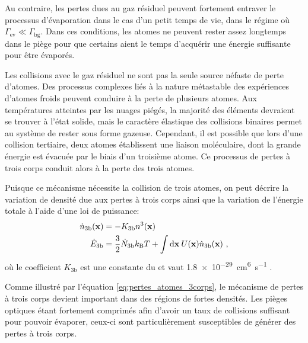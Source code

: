 Au contraire, les pertes dues au gaz résiduel peuvent fortement entraver le processus d'évaporation dans le cas d'un petit temps de vie, dans le régime où $\Gamma_{\mathrm{ev}} \ll \Gamma_{\mathrm{bg}}$. Dans ces conditions, les atomes ne peuvent rester assez longtemps dans le piège pour que certains aient le temps d'acquérir une énergie suffisante pour être évaporés.



Les collisions avec le gaz résiduel ne sont pas la seule source néfaste de perte d'atomes. Des processus complexes liés à la nature métastable des expériences d'atomes froids peuvent conduire à la perte de plusieurs atomes. Aux températures atteintes par les nuages piégés, la majorité des éléments devraient se trouver à l'état solide, mais le caractère élastique des collisions binaires permet au système de rester sous forme gazeuse. Cependant, il est possible que lors d'une collision tertiaire, deux atomes établissent une liaison moléculaire, dont la grande énergie est évacuée par le biais d'un troisième atome. Ce processus de pertes à trois corps conduit alors à la perte des trois atomes. 

Puisque ce mécanisme nécessite la collision de trois atomes, on peut décrire la variation de densité due aux pertes à trois corps ainsi que la variation de l'énergie totale à l'aide d'une loi de puissance:
\begin{align}
\dot{n}_{\mathrm{3b}}(\mathbf{x})&=-K_{\mathrm{3b}} n^3(\mathbf{x}) \label{eq:pertes_atomes_3corps} \\
\dot{E}_{\mathrm{3b}}&= \frac{3}{2}\dot{N}_{\mathrm{3b}} k_{\mathrm{B}} T + \int{\mathrm{d}\mathbf{x} \: U(\mathbf{x}) \dot{n}_{\mathrm{3b}}(\mathbf{x})}\text{ ,}
\end{align}
où le coefficient $K_{\mathrm{3b}}$ est une constante du  et vaut \SI{1.8e-29}{\centi\metre^6\second^{-1}} \citep{burt1997coherence}\citep{soding1999three}.


Comme illustré par l'équation \ref{eq:pertes_atomes_3corps}, le mécanisme de pertes à trois corps devient important dans des régions de fortes densités. Les pièges optiques étant fortement comprimés afin d'avoir un taux de collisions suffisant pour pouvoir évaporer, ceux-ci sont particulièrement susceptibles de générer des pertes à trois corps. 

